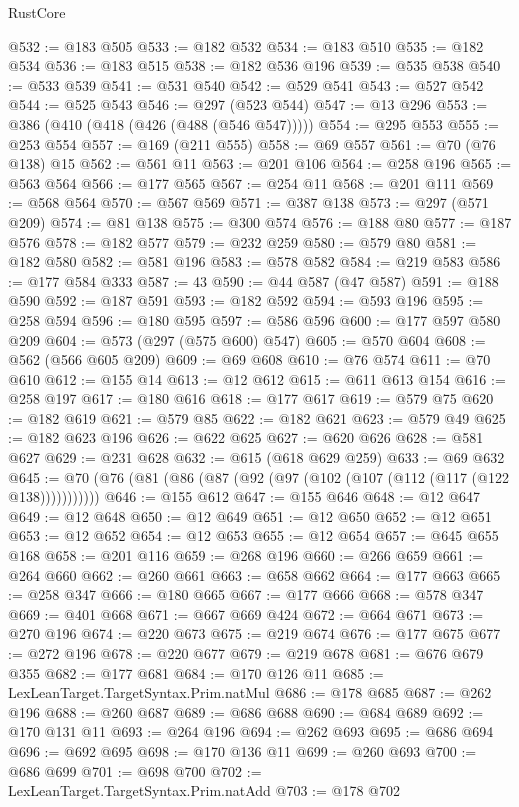 \begin{lexlean}{RustCore}
\begin{coremodule}
@532 := @183 @505
@533 := @182 @532
@534 := @183 @510
@535 := @182 @534
@536 := @183 @515
@538 := @182 @536 @196
@539 := @535 @538
@540 := @533 @539
@541 := @531 @540
@542 := @529 @541
@543 := @527 @542
@544 := @525 @543
@546 := @297 (@523 @544)
@547 := @13 @296
@553 := @386 (@410 (@418 (@426 (@488 (@546 @547)))))
@554 := @295 @553
@555 := @253 @554
@557 := @169 (@211 @555)
@558 := @69 @557
@561 := @70 (@76 @138) @15
@562 := @561 @11
@563 := @201 @106
@564 := @258 @196
@565 := @563 @564
@566 := @177 @565
@567 := @254 @11
@568 := @201 @111
@569 := @568 @564
@570 := @567 @569
@571 := @387 @138
@573 := @297 (@571 @209)
@574 := @81 @138
@575 := @300 @574
@576 := @188 @80
@577 := @187 @576
@578 := @182 @577
@579 := @232 @259
@580 := @579 @80
@581 := @182 @580
@582 := @581 @196
@583 := @578 @582
@584 := @219 @583
@586 := @177 @584 @333
@587 := 43
@590 := @44 @587 (@47 @587)
@591 := @188 @590
@592 := @187 @591
@593 := @182 @592
@594 := @593 @196
@595 := @258 @594
@596 := @180 @595
@597 := @586 @596
@600 := @177 @597 @580 @209
@604 := @573 (@297 (@575 @600) @547)
@605 := @570 @604
@608 := @562 (@566 @605 @209)
@609 := @69 @608
@610 := @76 @574
@611 := @70 @610
@612 := @155 @14
@613 := @12 @612
@615 := @611 @613 @154
@616 := @258 @197
@617 := @180 @616
@618 := @177 @617
@619 := @579 @75
@620 := @182 @619
@621 := @579 @85
@622 := @182 @621
@623 := @579 @49
@625 := @182 @623 @196
@626 := @622 @625
@627 := @620 @626
@628 := @581 @627
@629 := @231 @628
@632 := @615 (@618 @629 @259)
@633 := @69 @632
@645 := @70 (@76 (@81 (@86 (@87 (@92 (@97 (@102 (@107 (@112 (@117 (@122 @138)))))))))))
@646 := @155 @612
@647 := @155 @646
@648 := @12 @647
@649 := @12 @648
@650 := @12 @649
@651 := @12 @650
@652 := @12 @651
@653 := @12 @652
@654 := @12 @653
@655 := @12 @654
@657 := @645 @655 @168
@658 := @201 @116
@659 := @268 @196
@660 := @266 @659
@661 := @264 @660
@662 := @260 @661
@663 := @658 @662
@664 := @177 @663
@665 := @258 @347
@666 := @180 @665
@667 := @177 @666
@668 := @578 @347
@669 := @401 @668
@671 := @667 @669 @424
@672 := @664 @671
@673 := @270 @196
@674 := @220 @673
@675 := @219 @674
@676 := @177 @675
@677 := @272 @196
@678 := @220 @677
@679 := @219 @678
@681 := @676 @679 @355
@682 := @177 @681
@684 := @170 @126 @11
@685 := LexLeanTarget.TargetSyntax.Prim.natMul
@686 := @178 @685
@687 := @262 @196
@688 := @260 @687
@689 := @686 @688
@690 := @684 @689
@692 := @170 @131 @11
@693 := @264 @196
@694 := @262 @693
@695 := @686 @694
@696 := @692 @695
@698 := @170 @136 @11
@699 := @260 @693
@700 := @686 @699
@701 := @698 @700
@702 := LexLeanTarget.TargetSyntax.Prim.natAdd
@703 := @178 @702

\end{coremodule}
\end{lexlean}
